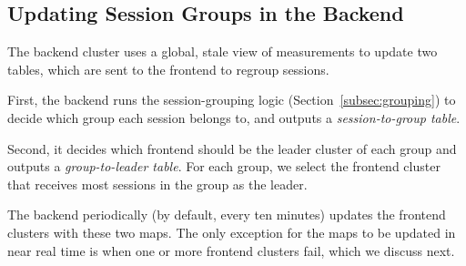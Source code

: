 \subsection{Updating Session Groups in the Backend}
\label{subsec:backend}

The backend cluster uses a global, stale view of measurements to update two tables, which are sent
 to the frontend to regroup sessions.
\begin{packeditemize}
\item First, the backend runs the session-grouping logic (Section~\ref{subsec:grouping}) to decide which group each session belongs to, and outputs a {\em session-to-group table}.
\item Second, it decides which frontend should be the leader cluster of each group and outputs a {\em group-to-leader table}. For each group, we select the frontend cluster that receives most sessions in the group as the leader.
\end{packeditemize}
The backend periodically (by default, every ten minutes) updates the frontend clusters with these two maps.  
The only exception for the maps to be updated in
near real time is when one or more frontend clusters fail, which we discuss next.



